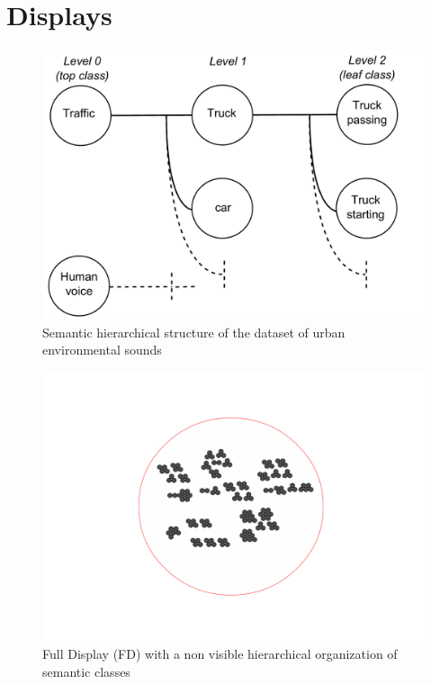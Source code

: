 \documentclass{aes2e}
\begin{document}

\section{Displays} \label{display}

\begin{figure}[t]
\begin{center}
\includegraphics[scale=0.24]{gfx/dataset.pdf} 
\end{center}
\caption{\label{figdataset} Semantic hierarchical structure of the dataset of urban environmental sounds}
\end{figure}

\begin{figure}[t!]
\begin{center}
\includegraphics[scale=0.30]{gfx/XP2clean.pdf} 
\end{center}
\caption{\label{figXP2} Full Display (FD) with a non visible hierarchical organization of semantic classes }
\end{figure}
\end{document}
